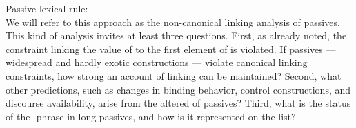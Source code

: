\documentclass[output=paper
 	        ,biblatex
                ,babelshorthands
                ,newtxmath
                ,draftmode
                ,colorlinks, citecolor=brown
]{langscibook}
\begin{document}

 \ea
\label{pass-lr}
 
Passive lexical rule:\\
\z
We will refer to this approach as the non-canonical linking analysis of passives. This kind of analysis invites at least three questions.
First, as already noted, the constraint linking the value of  to the first element of \argst is violated.
If passives --- widespread and hardly exotic constructions --- violate canonical linking constraints, how strong an account of linking can be maintained?
Second, what other predictions, such as changes in binding behavior, control constructions, and discourse availability, arise from the altered \argst of passives?
Third, what is the status of the -phrase in long passives, and how is it represented on the \argst list?
\end{document}

